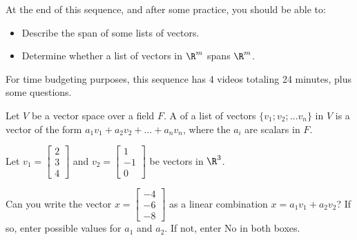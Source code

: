 







At the end of this sequence, and after some practice, you should be able to:

\begin{itemize}
\item Describe the span of some lists of vectors.
\item Determine whether a list of vectors in $\R^m$ spans $\R^m$.  
\end{itemize}


For time budgeting purposes, this sequence has 4 videos totaling 24 minutes, 
plus some questions.  




\endedxtext

\endedxvertical





Let $V$ be a vector space over a field $F$.  A {} of a list of vectors $\{v_1; v_2; 
\ldots v_n\}$
in $V$ is a vector of the form $a_1v_1 + a_2v_2 + \ldots + a_n v_n$, where the $a_i$ are scalars in $F$.  


\endedxtext


\endedxvertical






Let $v_1 = \left[\begin{array}{c} 2 \\ 3  \\ 4 \end{array} \right]$ and  
$v_2 = \left[\begin{array}{c} 1 \\ -1  \\ 0 \end{array} \right]$ be vectors in $\R^3$.

Can you write the vector $x  = \left[\begin{array}{c} -4 \\ -6  \\ -8 \end{array} \right]$
as a linear combination $x = a_1 v_1 + a_2 v_2$?  If so, enter possible values for $a_1$ and
$a_2$.  If not, enter No in both boxes.  

